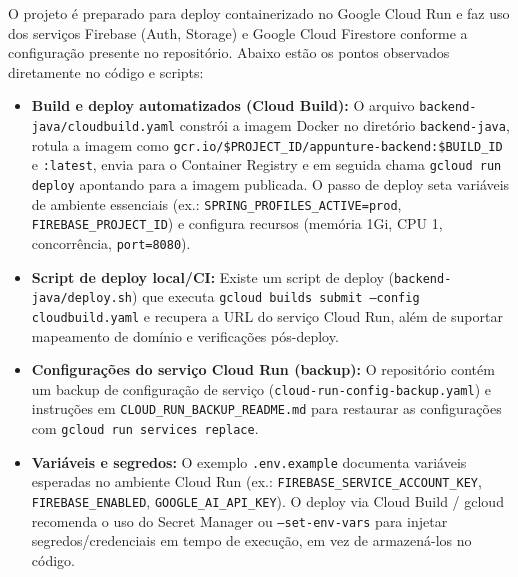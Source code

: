 O projeto é preparado para deploy containerizado no Google Cloud Run e faz uso dos serviços Firebase (Auth, Storage) e Google Cloud Firestore conforme a configuração presente no repositório. Abaixo estão os pontos observados diretamente no código e scripts:

\begin{itemize}
    \item \textbf{Build e deploy automatizados (Cloud Build):} O arquivo \texttt{backend-java/cloudbuild.yaml} constrói a imagem Docker no diretório \texttt{backend-java}, rotula a imagem como \texttt{gcr.io/\$PROJECT\_ID/appunture-backend:\$BUILD\_ID} e \texttt{:latest}, envia para o Container Registry e em seguida chama \texttt{gcloud run deploy} apontando para a imagem publicada. O passo de deploy seta variáveis de ambiente essenciais (ex.: \texttt{SPRING\_PROFILES\_ACTIVE=prod}, \texttt{FIREBASE\_PROJECT\_ID}) e configura recursos (memória 1Gi, CPU 1, concorrência, \texttt{port=8080}).

    \item \textbf{Script de deploy local/CI:} Existe um script de deploy (\texttt{backend-java/deploy.sh}) que executa \texttt{gcloud builds submit --config cloudbuild.yaml} e recupera a URL do serviço Cloud Run, além de suportar mapeamento de domínio e verificações pós-deploy.

    \item \textbf{Configurações do serviço Cloud Run (backup):} O repositório contém um backup de configuração de serviço (\texttt{cloud-run-config-backup.yaml}) e instruções em \texttt{CLOUD\_RUN\_BACKUP\_README.md} para restaurar as configurações com \texttt{gcloud run services replace}.

    \item \textbf{Variáveis e segredos:} O exemplo \texttt{.env.example} documenta variáveis esperadas no ambiente Cloud Run (ex.: \texttt{FIREBASE\_SERVICE\_ACCOUNT\_KEY}, \texttt{FIREBASE\_ENABLED}, \texttt{GOOGLE\_AI\_API\_KEY}). O deploy via Cloud Build / gcloud recomenda o uso do Secret Manager ou \texttt{--set-env-vars} para injetar segredos/credenciais em tempo de execução, em vez de armazená-los no código.


\end{itemize}
